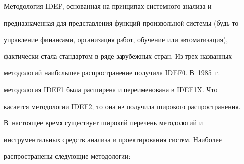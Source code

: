        


       Методология IDEF, основанная на принципах системного анализа и 


предназначенная для представления функций произвольной системы (будь то 


управление финансами, организация работ, обучение или автоматизация), 


фактически стала стандартом в ряде зарубежных стран. Из трех названных 


методологий наибольшее распространение получила IDEF0. В~1985~г.\ 


методология IDEF1 была расширена и переименована в IDEF1X. Что 


касается методологии IDEF2, то она не получила широкого распространения. 


В~настоящее время существует широкий перечень методологий и 


инструментальных средств анализа и проектирования систем. Наиболее 


распространены следующие методологии: 


